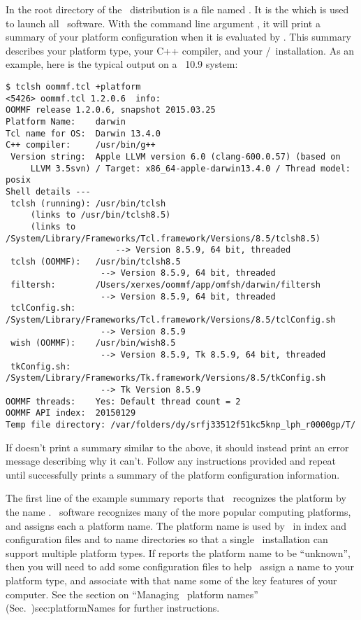 In the root directory of the \OOMMF\ distribution is a file
named .  It is the 
which is used to launch all \OOMMF\ software.  With the command line
argument , 
it will print a summary of your
platform configuration when it is evaluated by .
This summary describes your platform type, your C++ compiler,
and your \Tcl/\Tk\ installation.  As an example, 
here is the typical output on a \MacOSX\ 10.9 system:
\begin{verbatim}
$ tclsh oommf.tcl +platform
<5426> oommf.tcl 1.2.0.6  info:
OOMMF release 1.2.0.6, snapshot 2015.03.25
Platform Name:    darwin
Tcl name for OS:  Darwin 13.4.0
C++ compiler:     /usr/bin/g++ 
 Version string:  Apple LLVM version 6.0 (clang-600.0.57) (based on
     LLVM 3.5svn) / Target: x86_64-apple-darwin13.4.0 / Thread model: posix
Shell details ---
 tclsh (running): /usr/bin/tclsh
     (links to /usr/bin/tclsh8.5)
     (links to /System/Library/Frameworks/Tcl.framework/Versions/8.5/tclsh8.5)
                      --> Version 8.5.9, 64 bit, threaded
 tclsh (OOMMF):   /usr/bin/tclsh8.5
                   --> Version 8.5.9, 64 bit, threaded
 filtersh:        /Users/xerxes/oommf/app/omfsh/darwin/filtersh
                   --> Version 8.5.9, 64 bit, threaded
 tclConfig.sh:    /System/Library/Frameworks/Tcl.framework/Versions/8.5/tclConfig.sh
                   --> Version 8.5.9
 wish (OOMMF):    /usr/bin/wish8.5
                   --> Version 8.5.9, Tk 8.5.9, 64 bit, threaded
 tkConfig.sh:     /System/Library/Frameworks/Tk.framework/Versions/8.5/tkConfig.sh
                   --> Tk Version 8.5.9
OOMMF threads:    Yes: Default thread count = 2
OOMMF API index:  20150129
Temp file directory: /var/folders/dy/srfj33512f51kc5knp_lph_r0000gp/T/
\end{verbatim}

If  doesn't print a summary similar to the
above, it should instead print an error message describing why it can't.
Follow any instructions provided
and repeat until  successfully prints a summary
of the platform configuration information.

The first line of the example summary reports that \OOMMF\ recognizes
the platform by the name .  \OOMMF\ software recognizes many
of the more popular computing platforms, and assigns each a platform
name.  The platform name is used by \OOMMF\ in index and configuration
files and to name directories so that a single \OOMMF\ installation can
support multiple platform types.  If  reports
the platform name to be ``unknown'', then you will need to add some
configuration files to help \OOMMF\ assign a name to your platform type,
and associate with that name some of the key features of your computer.
See the section on
{``Managing \OOMMF\ platform names'' (Sec.~}{)}{sec:platformNames}
for further instructions.

